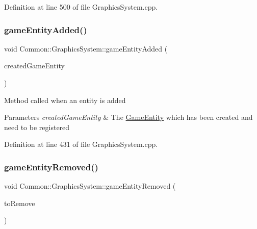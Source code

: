 Definition at line 500 of file Graphics\+System.\+cpp.

\mbox{\label{class_common_1_1_graphics_system_aaaac50f8c51dad1746ef48aaf87cad8d}} 
\subsubsection{\texorpdfstring{game\+Entity\+Added()}{gameEntityAdded()}}
{\footnotesize\ttfamily void Common\+::\+Graphics\+System\+::game\+Entity\+Added (\begin{DoxyParamCaption}\item[{const \hyperlink{struct_common_1_1_game_entity_manager_1_1_created_game_entity}{Game\+Entity\+Manager\+::\+Created\+Game\+Entity} $\ast$}]{created\+Game\+Entity }\end{DoxyParamCaption})\hspace{0.3cm}{\ttfamily [protected]}}

Method called when an entity is added 
\begin{DoxyParams}{Parameters}
{\em created\+Game\+Entity} & The \hyperlink{struct_common_1_1_game_entity}{Game\+Entity} which has been created and need to be registered \\
\hline
\end{DoxyParams}


Definition at line 431 of file Graphics\+System.\+cpp.

\mbox{\label{class_common_1_1_graphics_system_ad10ea4363b7d49f6a43bee937b031559}} 
\subsubsection{\texorpdfstring{game\+Entity\+Removed()}{gameEntityRemoved()}}
{\footnotesize\ttfamily void Common\+::\+Graphics\+System\+::game\+Entity\+Removed (\begin{DoxyParamCaption}\item[{\hyperlink{struct_common_1_1_game_entity}{Game\+Entity} $\ast$}]{to\+Remove }\end{DoxyParamCaption})\hspace{0.3cm}{\ttfamily [protected]}}

